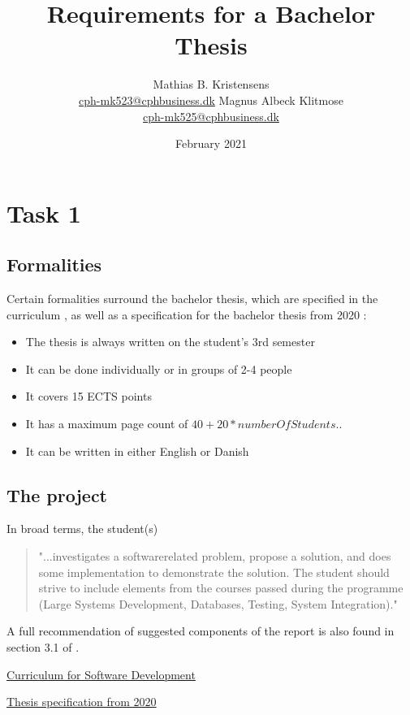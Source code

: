 \documentclass{article}
\title{Requirements for a Bachelor Thesis}
\author{
    Mathias B. Kristensens\\
    \href{mailto:cph-mk523@cphbusiness.dk}{cph-mk523@cphbusiness.dk}
    Magnus Albeck Klitmose\\
    \href{mailto:cph-mk523@cphbusiness.dk}{cph-mk525@cphbusiness.dk}
    }
\date{February 2021}
\begin{document}
   \maketitle
   \section{Task 1}
\subsection{Formalities}
Certain formalities surround the bachelor thesis, which are specified in the curriculum \cite{curriculum}, 
as well as a specification for the bachelor thesis from 2020 \cite{thesisspec}: 
\begin{itemize}
    \item The thesis is always written on the student's 3rd semester
    \item It can be done individually or in groups of 2-4 people
    \item It covers 15 ECTS points
    \item It has a maximum page count of  \(40 + 20 * number Of Students \)..
    \item It can be written in either English or Danish
  \end{itemize}

\subsection{The project}
In broad terms, the student(s) \begin{quotation}
    "...investigates a softwarerelated problem, propose a solution, and does some implementation to demonstrate the solution. 
    The student should strive to include elements from the courses passed during the programme (Large Systems Development, Databases, Testing, System Integration)." 
    \cite{thesisspec} 
\end{quotation}
A full recommendation of suggested components of the report is also found in section 3.1 of \cite{thesisspec}. 



\begin{thebibliography}{9}
    \href{https://www.cphbusiness.dk/media/1177/pba_soft_cba_studieordning.pdf}{Curriculum for Software Development} 

    \href{https://datsoftlyngby.github.io/soft2020fall/resources/bbe51cf2-bachelorProject.pdf}{Thesis specification from 2020} 
\end{thebibliography}
\end{document}
